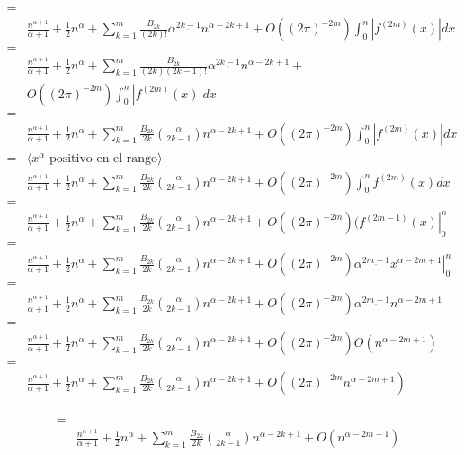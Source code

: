 \documentclass{article}
\begin{document}
\begin{align*}
= & \\
& \frac{n^{\alpha+1}}{\alpha+1}
  + \frac{1}{2} n^\alpha + \sum_{k=1}^m \frac{B_{2k}}{(2k)!} \alpha^{\underline{2k-1}} n^{\alpha-2k+1} +
  O((2\pi)^{-2m}) \int_0^n | f^{(2m)}(x) | dx \\
= & \\
& \frac{n^{\alpha+1}}{\alpha+1}
  + \frac{1}{2} n^\alpha + \sum_{k=1}^m \frac{B_{2k}}{(2k)(2k-1)!} \alpha^{\underline{2k-1}} n^{\alpha-2k+1} + \\
& O((2\pi)^{-2m}) \int_0^n | f^{(2m)}(x) | dx \\
= & \\
& \frac{n^{\alpha+1}}{\alpha+1}
  + \frac{1}{2} n^\alpha + \sum_{k=1}^m \frac{B_{2k}}{2k} \binom{\alpha}{2k-1} n^{\alpha-2k+1} + 
  O((2\pi)^{-2m}) \int_0^n | f^{(2m)}(x) | dx \\
= & \langle x^\alpha \text{ positivo en el rango} \rangle \\
& \frac{n^{\alpha+1}}{\alpha+1}
  + \frac{1}{2} n^\alpha + \sum_{k=1}^m \frac{B_{2k}}{2k} \binom{\alpha}{2k-1} n^{\alpha-2k+1} + 
  O((2\pi)^{-2m}) \int_0^n f^{(2m)}(x) dx \\
= & \\
& \frac{n^{\alpha+1}}{\alpha+1}
  + \frac{1}{2} n^\alpha + \sum_{k=1}^m \frac{B_{2k}}{2k} \binom{\alpha}{2k-1} n^{\alpha-2k+1} + 
  O((2\pi)^{-2m}) \left. (f^{(2m-1)}(x) \right|_0^n  \\
= & \\
& \frac{n^{\alpha+1}}{\alpha+1}
  + \frac{1}{2} n^\alpha + \sum_{k=1}^m \frac{B_{2k}}{2k} \binom{\alpha}{2k-1} n^{\alpha-2k+1} + 
  O((2\pi)^{-2m}) \left. \alpha^{\underline{2m-1}} x^{\alpha-2m+1} \right|_0^n  \\
= & \\
& \frac{n^{\alpha+1}}{\alpha+1}
  + \frac{1}{2} n^\alpha + \sum_{k=1}^m \frac{B_{2k}}{2k} \binom{\alpha}{2k-1} n^{\alpha-2k+1} + 
  O((2\pi)^{-2m}) \alpha^{\underline{2m-1}} n^{\alpha-2m+1}  \\
= & \\
& \frac{n^{\alpha+1}}{\alpha+1}
  + \frac{1}{2} n^\alpha + \sum_{k=1}^m \frac{B_{2k}}{2k} \binom{\alpha}{2k-1} n^{\alpha-2k+1} + 
  O((2\pi)^{-2m}) O(n^{\alpha-2m+1})  \\
= & \\
& \frac{n^{\alpha+1}}{\alpha+1}
  + \frac{1}{2} n^\alpha + \sum_{k=1}^m \frac{B_{2k}}{2k} \binom{\alpha}{2k-1} n^{\alpha-2k+1} + 
  O((2\pi)^{-2m} n^{\alpha-2m+1})  \\
\end{align*}

\begin{align*}
= & \\
& \frac{n^{\alpha+1}}{\alpha+1}
  + \frac{1}{2} n^\alpha + \sum_{k=1}^m \frac{B_{2k}}{2k} \binom{\alpha}{2k-1} n^{\alpha-2k+1} + 
  O(n^{\alpha-2m+1})  \\
\end{align*}
\end{document}
